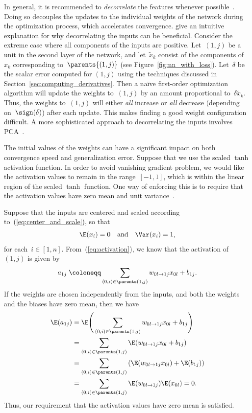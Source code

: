 \documentclass[11pt,a4paper]{article}
\numberwithin{equation}{section}
\newcommand{\weight}[2]{w_{#1 \rightarrow #2}}
\begin{document}
In general, it is recommended to \emph{decorrelate} the features whenever
possible~\citep{lecun-98b}. Doing so decouples the updates to the individual
weights of the network during the optimization process, which accelerates
convergence. \citet{lecun-98b} give an intuitive explanation for why
decorrelating the inputs can be beneficial. Consider the extreme case where all
components of the inputs are positive. Let~$(1, j)$ be a unit in the second
layer of the network, and let~$\tilde{x}_k$ consist of the components of~$x_k$
corresponding to~$\parents{(1, j)}$ (see Figure~\ref{fig:nn_with_loss}).
Let~$\delta$ be the scalar error computed for $(1, j)$ using the techniques
discussed in Section~\ref{sec:computing_derivatives}. Then a na\"{i}ve
first-order optimization algorithm will update the weights to~$(1, j)$ by an
amount proportional to~$\delta \tilde{x}_k$. Thus, the weights to~$(1, j)$ will
either \emph{all} increase or \emph{all} decrease (depending on~$\sign(\delta)$)
after each update. This makes finding a good weight configuration difficult. A
more sophisticated approach to decorrelating the inputs involves
PCA~\citep{lecun-98b, krizhevsky2012imagenet}.

The initial values of the weights can have a significant impact on both
convergence speed and generalization error. Suppose that we use the scaled
$\tanh$ activation function. In order to avoid vanishing gradient problem, we
would like the activation values to remain in the range~$[-1, 1]$, which is
within the linear region of the scaled $\tanh$ function. One way of enforcing
this is to require that the activation values have zero mean and unit
variance~\citep{lecun-98b}.

Suppose that the inputs are centered and scaled according
to~(\ref{eq:center_and_scale}), so that
\[
	\E(x_i) = 0 \quad\text{and}\quad \Var(x_i) = 1,
\]
for each~$i \in [1, n]$. From~(\ref{eq:activation}), we know that the activation
of~$(1, j)$ is given by
\[
	a_{1j} \;\coloneqq \sum_{(0, i) \in \parents(1, j)} \weight{0l}{1j} x_{0l} + b_{1j}.
\]
If the weights are chosen independently from the inputs, and both the weights
and the biases have zero mean, then we have
\begin{align*}
	\E(a_{1j})
	&= \E\Bigg(\sum_{(0, i) \in \parents(1, j)} \weight{0l}{1j} x_{0l} + b_{1j}\Bigg) \\
	&= \sum_{(0, i) \in \parents(1, j)} \E(\weight{0l}{1j} x_{0l} + b_{1j}) \\
	&= \sum_{(0, i) \in \parents(1, j)} \left(\E(\weight{0l}{1j} x_{0l}) + \E(b_{1j})\right) \\
	&= \sum_{(0, i) \in \parents(1, j)} \E(\weight{0l}{1j}) \E(x_{0l}) = 0.
\end{align*}
Thus, our requirement that the activation values have zero mean is satisfied.
\end{document}
